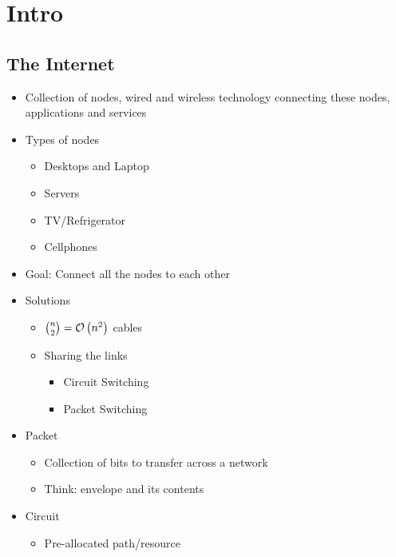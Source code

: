 \chapter{Intro}
\section{The Internet}
\begin{itemize}[nosep]
    \item Collection of nodes, wired and wireless technology connecting these nodes, applications and services
    \item Types of nodes
          \begin{itemize}[nosep]
              \item Desktops and Laptop
              \item Servers
              \item TV/Refrigerator
              \item Cellphones
          \end{itemize}
    \item Goal: Connect all the nodes to each other
    \item Solutions
          \begin{itemize}[nosep]
              \item $\binom{n}{2} = \mathcal{O}\left(n^2\right)$ cables
              \item Sharing the links
                    \begin{itemize}[nosep]
                        \item Circuit Switching
                        \item Packet Switching
                    \end{itemize}
          \end{itemize}
    \item Packet
          \begin{itemize}[nosep]
              \item Collection of bits to transfer across a network
              \item Think: envelope and its contents
          \end{itemize}
    \item Circuit
          \begin{itemize}[nosep]
              \item Pre-allocated path/resource
          \end{itemize}
\end{itemize}
